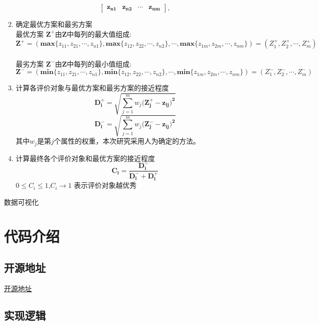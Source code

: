 \documentclass[UTF8]{ctexart}
\begin{document}
\begin{enumerate}
\begin{equation}
\begin{bmatrix}
		\bm{z_{n1}} & \bm{z_{n2}} & \cdots & \bm{z_{nm}}
		\end{bmatrix},
		\end{equation}
		\item 确定最优方案和最劣方案 \\
		最优方案 $\bm{Z^{+}}$由$\bm{Z}$中每列的最大值组成:
		\begin{equation}
		\bm{Z^{+}}=(\bm{max}\{z_{11},z_{21},\cdots,z_{n1}\},\bm{max}\{z_{12},z_{22},\cdots,z_{n2}\},\cdots,\bm{max}\{z_{1m},z_{2m},\cdots,z_{nm}\})
		=(Z_1^{+},Z_2^{+},\cdots,Z_m^{+})
		\end{equation}\\
		最劣方案 $\bm{Z^{-}}$由$\bm{Z}$中每列的最小值组成:
		\begin{equation}
		\bm{Z^{-}}=(\bm{min}\{z_{11},z_{21},\cdots,z_{n1}\},\bm{min}\{z_{12},z_{22},\cdots,z_{n2}\},\cdots,\bm{min}\{z_{1m},z_{2m},\cdots,z_{nm}\})=(Z_1^{-},Z_2^{-},\cdots,Z_m^{-})
		\end{equation}
		\item 计算各评价对象与最优方案和最劣方案的接近程度
		\begin{equation}
		\bm{D_i^{+}}=\sqrt{\sum_{j=1}^m {w_j(\bm{Z_j^{+}-z_{ij})^2}}}
		\end{equation}
		\begin{equation}
		\bm{D_i^{-}}=\sqrt{\sum_{j=1}^m {w_j(\bm{Z_j^{-}-z_{ij})^2}}}
		\end{equation}
		其中$w_j$是第$j$个属性的权重，本次研究采用人为确定的方法。
		\item 计算最终各个评价对象和最优方案的接近程度
		\begin{equation}
		\bm{C_i}=\frac{\bm{D_i^{-}}}{\bm{D_i^{-}}+\bm{D_i^{+}}}
		\end{equation}
		$0 \leq C_i \leq 1$,$C_i \rightarrow 1$ 表示评价对象越优秀
	\end{enumerate}
	\par 数据可视化
	\section{代码介绍}\label{sec3}
	\subsection{开源地址}
	\href{https://github.com/Coolingsky167/DataScienceHomework}{开源地址}
	\subsection{实现逻辑}
	
\end{document}
